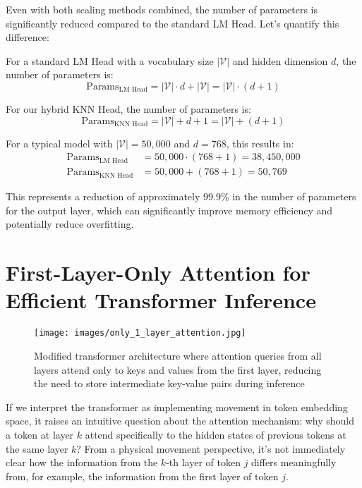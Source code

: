 Even with both scaling methods combined, the number of parameters is significantly reduced compared to the standard LM Head. Let's quantify this difference:

For a standard LM Head with a vocabulary size $|\mathcal{V}|$ and hidden dimension $d$, the number of parameters is:
\begin{equation}
    \text{Params}_{\text{LM Head}} = |\mathcal{V}| \cdot d + |\mathcal{V}| = |\mathcal{V}| \cdot (d + 1)
    \label{eq::lm_head_params}
\end{equation}

For our hybrid KNN Head, the number of parameters is:
\begin{equation}
    \text{Params}_{\text{KNN Head}} = |\mathcal{V}| + d + 1 = |\mathcal{V}| + (d + 1)
    \label{eq::knn_head_params}
\end{equation}

For a typical model with $|\mathcal{V}| = 50,000$ and $d = 768$, this results in:
\begin{align}
    \text{Params}_{\text{LM Head}} &= 50,000 \cdot (768 + 1) = 38,450,000 \\
    \text{Params}_{\text{KNN Head}} &= 50,000 + (768 + 1) = 50,769
\end{align}

This represents a reduction of approximately 99.9\% in the number of parameters for the output layer, which can significantly improve memory efficiency and potentially reduce overfitting.

\section{First-Layer-Only Attention for Efficient Transformer Inference}

\begin{figure}[!h]
    \centering
    \texttt{[image: images/only\_1\_layer\_attention.jpg]}
    \caption{Modified transformer architecture where attention queries from all layers attend only to keys and values from the first layer, reducing the need to store intermediate key-value pairs during inference}
    \label{fig:first_layer_attention}
\end{figure}

If we interpret the transformer as implementing movement in token embedding space, it raises an intuitive question about the attention mechanism: why should a token at layer $k$ attend specifically to the hidden states of previous tokens at the same layer $k$? From a physical movement perspective, it's not immediately clear how the information from the $k$-th layer of token $j$ differs meaningfully from, for example, the information from the first layer of token $j$.

